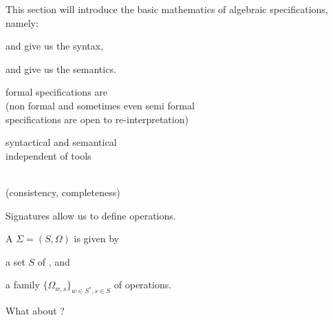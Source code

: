 \documentclass[landscape, slides, light]{mmiss}
\begin{document}
\begin{Package}[Label=AlgSpec,
  Title={Formal Program Development with Algebraic Specifications},
  Date=12.09.2002,
  Authors={Christoph L{\"u}th, Markus Roggenbach},
  PriorAuthors={Markus Roggenbach, Michael Drouineaud},
  ShortAuthor={C.~L{\"u}th, M.~Roggenbach},
  ShortTitle={Algebraic Specification},
  Language=en-GB,LevelOfDetail=Lecture,InteractionLevel=Hyper]

\begin{Section}[Label=IntroAlgSpec, Title={Signatures, Terms and Algebras}]

\begin{Abstract}[Label=Abstract, Title=Overview]
This section will introduce the basic mathematics of algebraic
specifications, namely:
\begin{Enumerate}
  \item {} and  give us the syntax,
  \item and  give us the semantics.
\end{Enumerate}  
\end{Abstract}

\begin{Introduction}[Label=Intro, Title={Why Formal Specification?}]
\begin{Itemize}
\item
formal specifications are   \\
(non formal and sometimes even semi formal \\
specifications are open to re-interpretation)\pause
\item
syntactical and semantical  \\ 
independent of tools 
\pause
\item{}
 \\
(consistency, completeness)
\end{Itemize}
\end{Introduction}


\begin{Paragraph}[Label=Signatures, Title=Signatures]
Signatures allow us to define operations.
\vspace{1cm}

\begin{Definition}[Label=DefSignature, Title=Signature]
A  $\Sigma=(S, \Omega)$ is given by 
\begin{Itemize}
    \item a set $S$ of , and 
    \item a family $\{\Omega_{w,s}\}_{w\in S^{*},s\in S}$ of operations. 
  \end{Itemize}
What about ?
\end{Definition}


\end{Paragraph}
\end{Section}
\end{Package}
\end{document}
